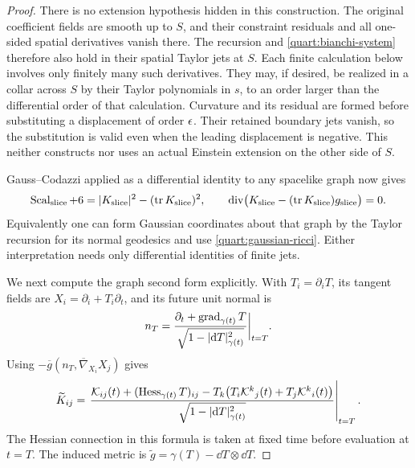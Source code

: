 \begin{proof}
There is no extension hypothesis hidden in this construction.  The
original coefficient fields are smooth up to \(S\), and their
constraint residuals and all one-sided spatial derivatives vanish
there.  The recursion and \eqref{quart:bianchi-system} therefore also
hold in their spatial Taylor jets at \(S\).  Each finite calculation
below involves only finitely many such derivatives.  They may, if
desired, be realized in a collar across \(S\) by their Taylor
polynomials in \(s\), to an order larger than the differential order
of that calculation.  Curvature and its residual are formed before
substituting a displacement of order \(\epsilon\).  Their retained
boundary jets vanish, so the substitution is valid even when the
leading displacement is negative.  This neither constructs nor uses
an actual Einstein extension on the other side of \(S\).

Gauss--Codazzi applied as a differential identity to any spacelike
graph now gives
\begin{equation}
 \operatorname{Scal}_{\rm slice}+6
   =|K_{\rm slice}|^2-(\operatorname{tr} K_{\rm slice})^2,
 \qquad
 \operatorname{div}\bigl(K_{\rm slice}-(\operatorname{tr} K_{\rm slice})g_{\rm slice}\bigr)=0.
 \label{quart:slice-constraints}
\end{equation}
Equivalently one can form Gaussian coordinates about that graph by
the Taylor recursion for its normal geodesics and use
\eqref{quart:gaussian-ricci}.  Either interpretation needs only
differential identities of finite jets.

We next compute the graph second form explicitly.  With
\(T_i=\partial_iT\), its tangent fields are
\(X_i=\partial_i+T_i\partial_t\), and its future unit normal is
\[
 n_T=\frac{\partial_t+\operatorname{grad}_{\gamma(t)}T}
             {\sqrt{1-|\mathrm{d} T|_{\gamma(t)}^2}}\bigg|_{t=T}.
\]
Using \(-\overline g(n_T,\overline\nabla_{X_i}X_j)\) gives
\begin{equation}
 \widetilde K_{ij}
  =\left.
    \frac{\mathcal K_{ij}(t)+(\operatorname{Hess}_{\gamma(t)}T)_{ij}
       -T_k\bigl(T_i\mathcal K^k{}_j(t)
                 +T_j\mathcal K^k{}_i(t)\bigr)}
     {\sqrt{1-|\mathrm{d} T|_{\gamma(t)}^2}}
   \right|_{t=T}.
 \label{quart:graph-k}
\end{equation}
The Hessian connection in this formula is taken at fixed time before
evaluation at \(t=T\).  The induced metric is
\(\widetilde g=\gamma(T)-\dd T\otimes\dd T\).


\end{proof}
